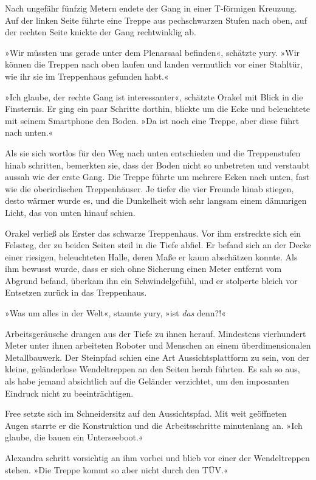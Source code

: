Nach ungefähr fünfzig Metern endete der Gang in einer T-förmigen Kreuzung. Auf der linken Seite führte eine Treppe aus pechschwarzen Stufen nach oben, auf der rechten Seite knickte der Gang rechtwinklig ab.

»Wir müssten uns gerade unter dem Plenarsaal befinden«, schätzte yury. »Wir können die Treppen nach oben laufen und landen vermutlich vor einer Stahltür, wie ihr sie im Treppenhaus gefunden habt.«

»Ich glaube, der rechte Gang ist interessanter«, schätzte Orakel mit Blick in die Finsternis. Er ging ein paar Schritte dorthin, blickte um die Ecke und beleuchtete mit seinem Smartphone den Boden. »Da ist noch eine Treppe, aber diese führt nach unten.«

Als sie sich wortlos für den Weg nach unten entschieden und die Treppenstufen hinab schritten, bemerkten sie, dass der Boden nicht so unbetreten und verstaubt aussah wie der erste Gang. Die Treppe führte um mehrere Ecken nach unten, fast wie die oberirdischen Treppenhäuser. Je tiefer die vier Freunde hinab stiegen, desto wärmer wurde es, und die Dunkelheit wich sehr langsam einem dämmrigen Licht, das von unten hinauf schien.

Orakel verließ als Erster das schwarze Treppenhaus. Vor ihm erstreckte sich ein Felssteg, der zu beiden Seiten steil in die Tiefe abfiel. Er befand sich an der Decke einer riesigen, beleuchteten Halle, deren Maße er kaum abschätzen konnte. Als ihm bewusst wurde, dass er sich ohne Sicherung einen Meter entfernt vom Abgrund befand, überkam ihn ein Schwindelgefühl, und er stolperte bleich vor Entsetzen zurück in das Treppenhaus.

»Was um alles in der Welt«, staunte yury, »ist \emph{das} denn?!«

Arbeitsgeräusche drangen aus der Tiefe zu ihnen herauf. Mindestens vierhundert Meter unter ihnen arbeiteten Roboter und Menschen an einem überdimensionalen Metallbauwerk. Der Steinpfad schien eine Art Aussichtsplattform zu sein, von der kleine, geländerlose Wendeltreppen an den Seiten herab führten. Es sah so aus, als habe jemand absichtlich auf die Geländer verzichtet, um den imposanten Eindruck nicht zu beeinträchtigen.

Free setzte sich im Schneidersitz auf den Aussichtspfad. Mit weit geöffneten Augen starrte er die Konstruktion und die Arbeitsschritte minutenlang an. »Ich glaube, die bauen ein Unterseeboot.«

Alexandra schritt vorsichtig an ihm vorbei und blieb vor einer der Wendeltreppen stehen. »Die Treppe kommt so aber nicht durch den TÜV.«

